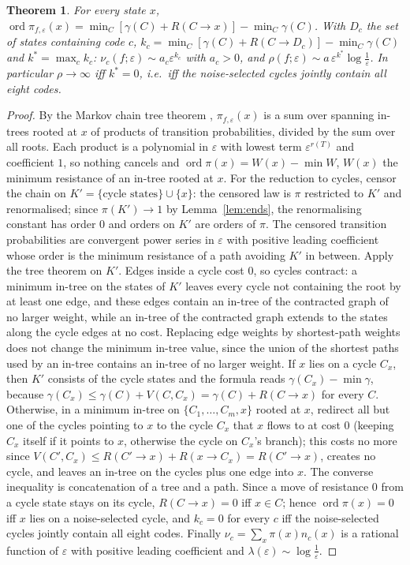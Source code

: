 \documentclass[11pt,a4paper]{article}
\newtheorem{theorem}{Theorem}
\theoremstyle{remark}
\newcommand{\eps}{\varepsilon}
\begin{document}
\begin{theorem}\label{thm:order}
For every state $x$, $\operatorname{ord}\pi_{f,\eps}(x)=\min_C[\gamma(C)+R(C\to x)]-\min_C\gamma(C)$. With $D_c$ the set of states containing code $c$, $k_c=\min_C[\gamma(C)+R(C\to D_c)]-\min_C\gamma(C)$ and $k^*=\max_ck_c$: $\nu_c(f;\eps)\sim a_c\eps^{k_c}$ with $a_c>0$, and $\rho(f;\eps)\sim a\,\eps^{k^*}\log\frac1\eps$. In particular $\rho\to\infty$ iff $k^*=0$, i.e.\ iff the noise-selected cycles jointly contain all eight codes.
\end{theorem}
\begin{proof}
By the Markov chain tree theorem \citep[Thm.~1.1]{PitmanTang2018}, $\pi_{f,\eps}(x)$ is a sum over spanning in-trees rooted at $x$ of products of transition probabilities, divided by the sum over all roots. Each product is a polynomial in $\eps$ with lowest term $\eps^{r(T)}$ and coefficient $1$, so nothing cancels and $\operatorname{ord}\pi(x)=W(x)-\min W$, $W(x)$ the minimum resistance of an in-tree rooted at $x$. For the reduction to cycles, censor the chain on $K'=\{\text{cycle states}\}\cup\{x\}$: the censored law is $\pi$ restricted to $K'$ and renormalised; since $\pi(K')\to1$ by Lemma~\ref{lem:ends}, the renormalising constant has order $0$ and orders on $K'$ are orders of $\pi$. The censored transition probabilities are convergent power series in $\eps$ with positive leading coefficient whose order is the minimum resistance of a path avoiding $K'$ in between. Apply the tree theorem on $K'$. Edges inside a cycle cost $0$, so cycles contract: a minimum in-tree on the states of $K'$ leaves every cycle not containing the root by at least one edge, and these edges contain an in-tree of the contracted graph of no larger weight, while an in-tree of the contracted graph extends to the states along the cycle edges at no cost. Replacing edge weights by shortest-path weights does not change the minimum in-tree value, since the union of the shortest paths used by an in-tree contains an in-tree of no larger weight. If $x$ lies on a cycle $C_x$, then $K'$ consists of the cycle states and the formula reads $\gamma(C_x)-\min\gamma$, because $\gamma(C_x)\le\gamma(C)+V(C,C_x)=\gamma(C)+R(C\to x)$ for every $C$. Otherwise, in a minimum in-tree on $\{C_1,\dots,C_m,x\}$ rooted at $x$, redirect all but one of the cycles pointing to $x$ to the cycle $C_x$ that $x$ flows to at cost $0$ (keeping $C_x$ itself if it points to $x$, otherwise the cycle on $C_x$'s branch); this costs no more since $V(C',C_x)\le R(C'\to x)+R(x\to C_x)=R(C'\to x)$, creates no cycle, and leaves an in-tree on the cycles plus one edge into $x$. The converse inequality is concatenation of a tree and a path. Since a move of resistance $0$ from a cycle state stays on its cycle, $R(C\to x)=0$ iff $x\in C$; hence $\operatorname{ord}\pi(x)=0$ iff $x$ lies on a noise-selected cycle, and $k_c=0$ for every $c$ iff the noise-selected cycles jointly contain all eight codes. Finally $\nu_c=\sum_x\pi(x)n_c(x)$ is a rational function of $\eps$ with positive leading coefficient and $\lambda(\eps)\sim\log\frac1\eps$.
\end{proof}
\end{document}
